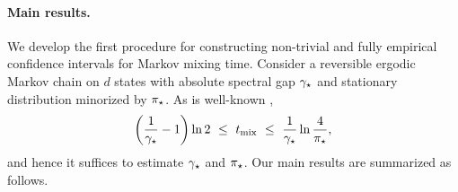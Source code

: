 \paragraph{Main results.}
We develop the first procedure for constructing non-trivial
and fully empirical confidence intervals for Markov mixing time.
Consider a reversible ergodic Markov chain on $d$ states with absolute
spectral gap $\gamma_{\star}$ and stationary distribution minorized by $\pi_{\star}$. 
As is well-known \citep[Theorems~12.3 and~12.4]{LePeWi08},
\begin{equation}
  \label{eq:mixing-time-bound}
  \left(\frac1{\gamma_{\star}} - 1\right) \ln2
  \ \leq \ t_{\operatorname{mix}}
  \ \leq \ \frac1{\gamma_{\star}} \ln \frac4{\pi_{\star}}
  ,
\end{equation}
and hence it suffices to estimate $\gamma_{\star}$ and $\pi_{\star}$. 
Our main results are summarized as follows.
